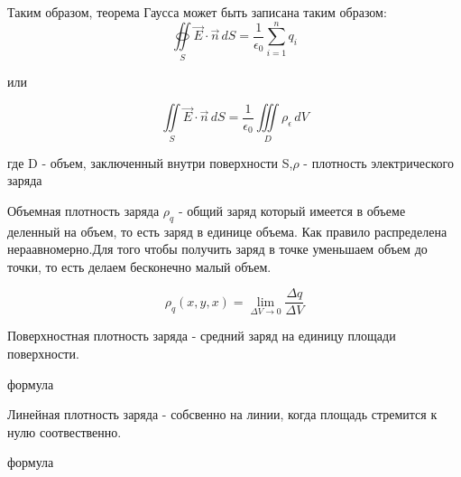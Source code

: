 \documentclass[../main.tex]{subfiles}
\begin{document}
Таким образом, теорема Гаусса может быть записана таким образом:
\[ \oiint\limits_S \vec E \cdot \vec n \,  dS = \frac{1}{\epsilon_0} \sum_{i=1}^{n} q_i\]
\begin{center}
    или
\end{center}
\[\iint \limits_S \vec E \cdot \vec n \, dS  = \frac{1}{\epsilon_0} \iiint\limits_D \rho_\epsilon \, dV\]
\begin{center}
    где D - объем, заключенный внутри поверхности S,\linebreak $\rho$ - плотность электрического заряда
\end{center}

 Объемная плотность заряда $\rho_q$ - общий заряд который имеется в объеме деленный на объем, то есть заряд в единице объема. 
Как правило распределена нераавномерно.Для того чтобы получить заряд в точке уменьшаем объем до точки, то есть делаем бесконечно малый объем.

\[ \rho_q(x,y,x) = \lim_{\Delta V \to 0} \frac{\Delta q}{\Delta V}\]

Поверхностная плотность заряда - средний заряд на единицу площади поверхности. 

формула

Линейная плотность заряда  - собсвенно на линии, когда площадь стремится к нулю соотвественно.

формула
\end{document}
